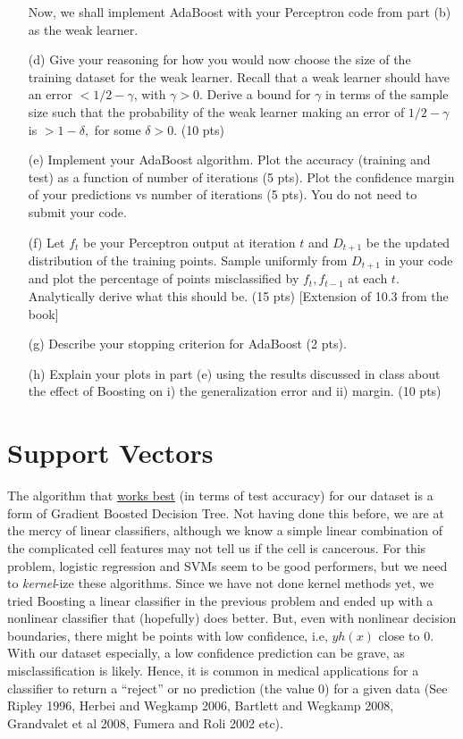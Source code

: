 \documentclass[12pt]{article}
\begin{document}
\begin{itemize}
		Now, we shall implement AdaBoost with your Perceptron code from part (b) as the weak learner. 
	\item[(d)] Give your reasoning for how you would now choose the size of the training dataset for the weak learner. Recall that a weak learner should have an error $< 1/2 - \gamma$, with $\gamma > 0$. Derive a bound for $\gamma$ in terms of the sample size such that the probability of the weak learner making an error of $1/2 - \gamma$ is $> 1- \delta,$ for some $\delta > 0.$ (10 pts)
	\item[(e)] Implement your AdaBoost algorithm. Plot the accuracy (training and test) as a function of number of iterations (5 pts). Plot the confidence margin of your predictions vs number of iterations (5 pts). You do not need to submit your code.
	\item[(f)] Let $f_t$ be your Perceptron output at iteration $t$ and $D_{t+1}$ be the updated distribution of the training points. Sample uniformly from $D_{t+1}$ in your code and plot the percentage of points misclassified by $f_t, f_{t-1}$ at each $t$. Analytically derive what this should be. (15 pts) [Extension of 10.3 from the book]
	\item[(g)] Describe your stopping criterion for AdaBoost (2 pts).
	\item[(h)] Explain your plots in part (e) using the results discussed in class about the effect of Boosting on i) the generalization error and ii) margin.  (10 pts)


\end{itemize}

\section{Support Vectors}

The algorithm that \href{https://archive.ics.uci.edu/dataset/17/breast+cancer+wisconsin+diagnostic}{works best} (in terms of test accuracy) for our dataset is a form of Gradient Boosted Decision Tree. Not having done this before, we are at the mercy of linear classifiers, although we know a simple linear combination of the complicated cell features may not tell us if the cell is cancerous. For this problem, logistic regression and SVMs seem to be good performers, but we need to \emph{kernel}-ize these algorithms. Since we have not done kernel methods yet, we tried Boosting a linear classifier in the previous problem and ended up with a nonlinear classifier that (hopefully) does better.
But, even with nonlinear decision boundaries, there might be points with low confidence, i.e, $y h(x)$ close to 0. With our dataset especially, a low confidence prediction can be grave, as misclassification is likely. Hence, it is common in medical applications for a classifier to return a ``reject'' or no prediction (the value 0) for a given data (See Ripley 1996, Herbei and Wegkamp 2006, Bartlett and Wegkamp 2008, Grandvalet et al 2008, Fumera and Roli 2002 etc). 
\end{document}
